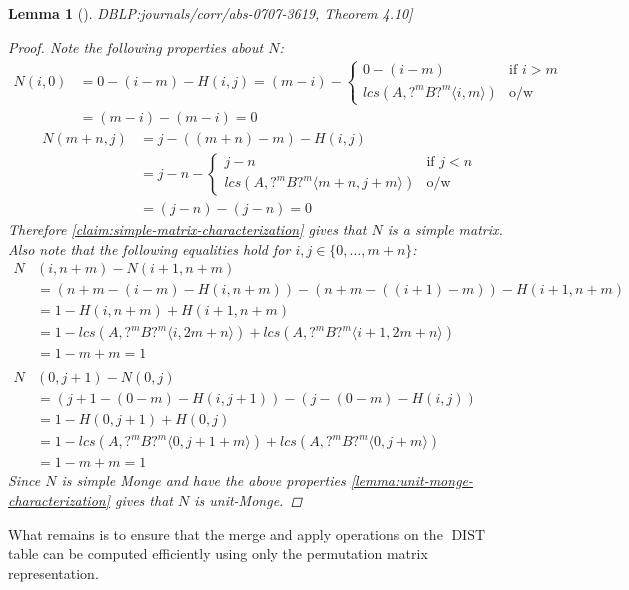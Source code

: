 \documentclass[twoside,11pt,openright]{report}
\newcommand{\DIST}{\operatorname{DIST}}
\newcommand{\substr}[3]{#1\langle #2, #3 \rangle}
\newcommand{\refbook}[2]{\cite[#1]{DBLP:journals/corr/abs-0707-3619}, #2}
\newtheorem{lemma}{Lemma}
\begin{document}
\begin{lemma}[\refbook{p.-49}{Theorem 4.10}]
\begin{proof}
    Note the following properties about $N$:
    \begin{align*}
      N(i, 0) &= 0 - (i - m) - H(i, j)
        = (m - i) - \begin{cases}
          0 - (i - m)                    & \text{if } i > m \\
          lcs(A, \substr{?^mB?^m}{i}{m}) & \text{o/w}
        \end{cases} \\
        &= (m - i) - (m - i) = 0
    \end{align*}
    \begin{align*}
      N(m + n, j) &= j - ((m + n) - m) - H(i, j) \\
        &= j - n - \begin{cases}
          j - n                                   & \text{if } j < n \\
          lcs(A, \substr{?^mB?^m}{m + n}{j + m})  & \text{o/w}
        \end{cases} \\
        &= (j - n) - (j - n) = 0
    \end{align*}
    Therefore \cref{claim:simple-matrix-characterization} gives that $N$ is a simple matrix. Also note that the following equalities hold for $i,j \in \{0, \dots, m + n\}$:
    \begin{align*}
      N&(i, n + m) - N(i + 1, n + m) \\
        &= (n + m - (i - m) - H(i, n + m)) - (n + m - ((i + 1) - m)) - H(i + 1, n + m) \\
        &= 1 - H(i, n + m) + H(i + 1, n + m) \\
        &= 1 - lcs(A, \substr{?^mB?^m}{i}{2m+n}) + lcs(A, \substr{?^mB?^m}{i + 1}{2m+n}) \\
        &= 1 - m + m = 1
    \\ \\
      N&(0, j + 1) - N(0, j) \\
        &= (j + 1 - (0 - m) - H(i, j + 1)) - (j - (0 - m) - H(i, j)) \\
        &= 1 - H(0, j + 1) + H(0, j) \\
        &= 1 - lcs(A, \substr{?^mB?^m}{0}{j + 1 + m}) + lcs(A, \substr{?^mB?^m}{0}{j + m}) \\
        &= 1 - m + m = 1
    \end{align*}
    Since $N$ is simple Monge and have the above properties \cref{lemma:unit-monge-characterization} gives that $N$ is unit-Monge.
  \end{proof}
\end{lemma}
What remains is to ensure that the merge and apply operations on the $\DIST$ table can be computed efficiently using only the permutation matrix representation.
\end{document}
